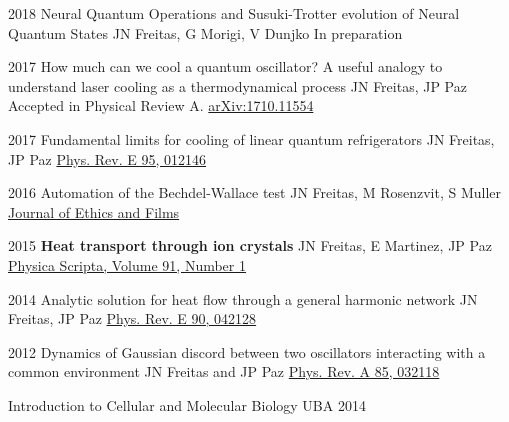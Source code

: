 

\begin{cvpubs}
\cvpub
    {2018} 
    {Neural Quantum Operations and Susuki-Trotter evolution of Neural Quantum States} 
    {JN Freitas, G Morigi, V Dunjko} 
    {In preparation} 

\cvpub
    {2017} 
    {How much can we cool a quantum oscillator? A useful analogy to understand laser cooling as a thermodynamical process}
    {JN Freitas, JP Paz}
    {Accepted in Physical Review A. \href{https://arxiv.org/abs/1710.11554}{arXiv:1710.11554}}

\cvpub
    {2017}
    {Fundamental limits for cooling of linear quantum refrigerators}
    {JN Freitas, JP Paz}
    {\href{http://journals.aps.org/pre/abstract/10.1103/PhysRevE.95.012146}{Phys. Rev. E 95, 012146}}

\cvpub 
    {2016}
    {Automation of the Bechdel-Wallace test}
    {JN Freitas, M Rosenzvit, S Muller}
    {\href{http://www.journal.eticaycine.org/Automation-of-the-Bechdel-Wallace}{Journal of Ethics and Films}}

\cvpub 
    {2015} 
    {\bf Heat transport through ion crystals}
    {JN Freitas, E Martinez, JP Paz}
    {\href{http://iopscience.iop.org/article/10.1088/0031-8949/91/1/013007/meta}{Physica Scripta, Volume 91, Number 1}}

\cvpub
    {2014} 
    {Analytic solution for heat flow through a general harmonic network}
    {JN Freitas, JP Paz} 
    {\href{http://journals.aps.org/pre/abstract/10.1103/PhysRevE.90.042128}{Phys. Rev. E 90, 042128}}

\cvpub 
    {2012} 
    {Dynamics of Gaussian discord between two oscillators interacting with a common environment}
    {JN Freitas and JP Paz} 
    {\href{http://pra.aps.org/abstract/PRA/v85/i3/e032118}{Phys. Rev. A 85, 032118}}

\end{cvpubs}


\begin{cvhonors}

  \cvhonor
    {Introduction to Cellular and Molecular Biology} 
    {UBA} %
    {} %
    {2014} %


\end{cvhonors}
